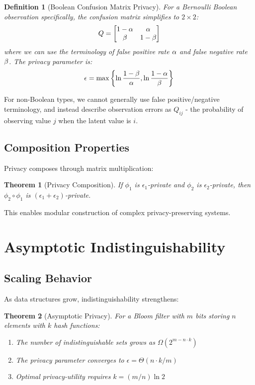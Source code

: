 \documentclass[11pt]{article}
\newtheorem{definition}{Definition}
\newtheorem{theorem}{Theorem}
\begin{document}
\begin{definition}[Boolean Confusion Matrix Privacy]
For a Bernoulli Boolean observation specifically, the confusion matrix simplifies to $2 \times 2$:
$$Q = \begin{bmatrix}
1-\alpha & \alpha \\
\beta & 1-\beta
\end{bmatrix}$$
where we can use the terminology of false positive rate $\alpha$ and false negative rate $\beta$. The privacy parameter is:
$$\epsilon = \max\left\{\ln\frac{1-\beta}{\alpha}, \ln\frac{1-\alpha}{\beta}\right\}$$
\end{definition}

For non-Boolean types, we cannot generally use false positive/negative terminology, and instead describe observation errors as $Q_{ij}$ - the probability of observing value $j$ when the latent value is $i$.

\subsection{Composition Properties}

Privacy composes through matrix multiplication:

\begin{theorem}[Privacy Composition]
If $\phi_1$ is $\epsilon_1$-private and $\phi_2$ is $\epsilon_2$-private, then $\phi_2 \circ \phi_1$ is $(\epsilon_1 + \epsilon_2)$-private.
\end{theorem}

This enables modular construction of complex privacy-preserving systems.

\section{Asymptotic Indistinguishability}

\subsection{Scaling Behavior}

As data structures grow, indistinguishability strengthens:

\begin{theorem}[Asymptotic Privacy]
For a Bloom filter with $m$ bits storing $n$ elements with $k$ hash functions:
\begin{enumerate}
\item The number of indistinguishable sets grows as $\Omega(2^{m-n\cdot k})$
\item The privacy parameter converges to $\epsilon = \Theta(n \cdot k / m)$
\item Optimal privacy-utility requires $k = (m/n) \ln 2$
\end{enumerate}
\end{theorem}
\end{document}
